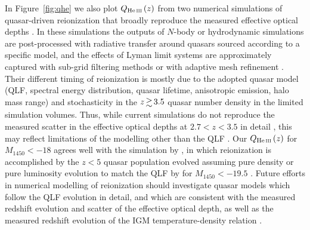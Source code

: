 \documentclass[fleqn,usenatbib]{mnras}
\begin{document}
In Figure~\ref{fig:qhe} we also plot $Q_\ion{He}{iii}\left(z\right)$ from two numerical simulations of quasar-driven
 reionization \citep{2009ApJ...694..842M,2014MNRAS.445.4186C} that broadly reproduce the measured
 effective optical depths \citep{2016ApJ...825..144W}. In these simulations the outputs of $N$-body or
hydrodynamic simulations are post-processed with radiative transfer around quasars sourced according to a specific model,
and the effects of  Lyman limit systems are approximately captured with sub-grid filtering methods
\citep{2009ApJ...694..842M} or with adaptive mesh refinement \citep{2014MNRAS.445.4186C}.
Their different timing of  reionization is mostly due to the adopted quasar model
(QLF, spectral energy distribution, quasar lifetime, anisotropic emission, halo mass range) and stochasticity in the
$z\ga 3.5$ quasar number density in the limited simulation volumes.
Thus, while current simulations do not reproduce the measured scatter in the  effective optical depths at
$2.7<z<3.5$ in detail \citep{2016ApJ...825..144W}, this may reflect limitations of the modelling other than the QLF
\citep{2017MNRAS.468.4691D}. Our $Q_\ion{He}{iii}\left(z\right)$ for $M_{1450}<-18$ agrees well with the simulation
by \citet{2014MNRAS.445.4186C}, in which  reionization is accomplished by the $z<5$ quasar population
evolved assuming pure density or pure luminosity evolution to match the QLF by \citet{2011ApJ...728L..26G} for
$M_{1450}<-19.5$ \citep[see also][]{2013MNRAS.435.3169C}. Future efforts in numerical modelling of 
reionization should investigate quasar models which follow the QLF evolution in detail, and which are consistent with
the measured redshift evolution and scatter of the  effective optical depth, as well as the measured redshift evolution
of the IGM temperature-density relation \citep[e.g.][]{2011MNRAS.410.1096B,2014MNRAS.441.1916B,2018MNRAS.474.2871R,2017arXiv171000700H}.
\end{document}
